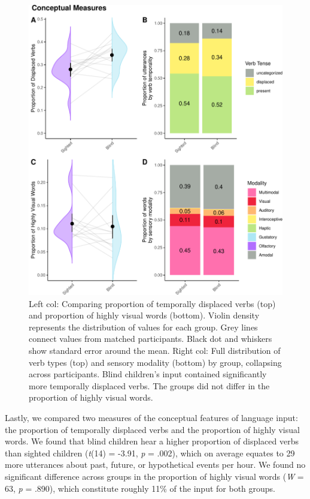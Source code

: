 \documentclass[
  man]{apa6}
\begin{document}
\begin{figure}
\centering
\includegraphics{input_quality_manuscript_files/figure-latex/conceptual-plots-1.pdf}
\caption{\label{fig:conceptual-plots}Left col: Comparing proportion of temporally displaced verbs (top) and proportion of highly visual words (bottom). Violin density represents the distribution of values for each group. Grey lines connect values from matched participants. Black dot and whiskers show standard error around the mean. Right col: Full distribution of verb types (top) and sensory modality (bottom) by group, collapsing across participants. Blind children's input contained significantly more temporally displaced verbs. The groups did not differ in the proportion of highly visual words.}
\end{figure}

Lastly, we compared two measures of the conceptual features of language input: the proportion of temporally displaced verbs and the proportion of highly visual words. We found that blind children hear a higher proportion of displaced verbs than sighted children (\emph{t}(14) = -3.91, \emph{p} = .002), which on average equates to 29 more utterances about past, future, or hypothetical events per hour. We found no significant difference across groups in the proportion of highly visual words (\emph{W} = 63, \emph{p} = .890), which constitute roughly 11\% of the input for both groups.
\end{document}

